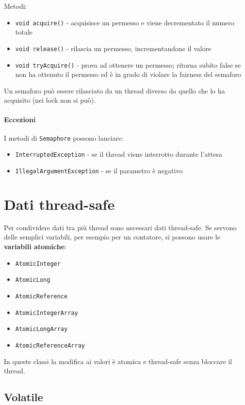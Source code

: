 Metodi:
\begin{itemize}
\item \texttt{void acquire()} - acquisisce un permesso e viene decrementato il numero totale
\item \texttt{void release()} - rilascia un permesso, incrementandone il valore
\item \texttt{void tryAcquire()} - prova ad ottenere un permesso; ritorna subito false se non ha ottenuto il permesso ed è in grado di violare la fairness del semaforo
\end{itemize}

Un semaforo può essere rilasciato da un thread diverso da quello che lo ha acquisito (nei lock non si può).
\paragraph{Eccezioni} I metodi di \texttt{Semaphore} possono lanciare:
\begin{itemize}
\item \texttt{InterruptedException} - se il thread viene interrotto durante l'attesa
\item \texttt{IllegalArgumentException} - se il parametro è negativo
\end{itemize}

\section{Dati thread-safe}
Per condividere dati tra più thread sono necessari dati thread-safe. Se servono delle semplici variabili, per esempio per un contatore, si possono usare le \textbf{variabili atomiche}:
\begin{itemize}
\item \texttt{AtomicInteger}
\item \texttt{AtomicLong}
\item \texttt{AtomicReference}
\item \texttt{AtomicIntegerArray}
\item \texttt{AtomicLongArray}
\item \texttt{AtomicReferenceArray}
\end{itemize}
In queste classi la modifica ai valori è atomica e thread-safe senza bloccare il thread.

\subsection{Volatile}

